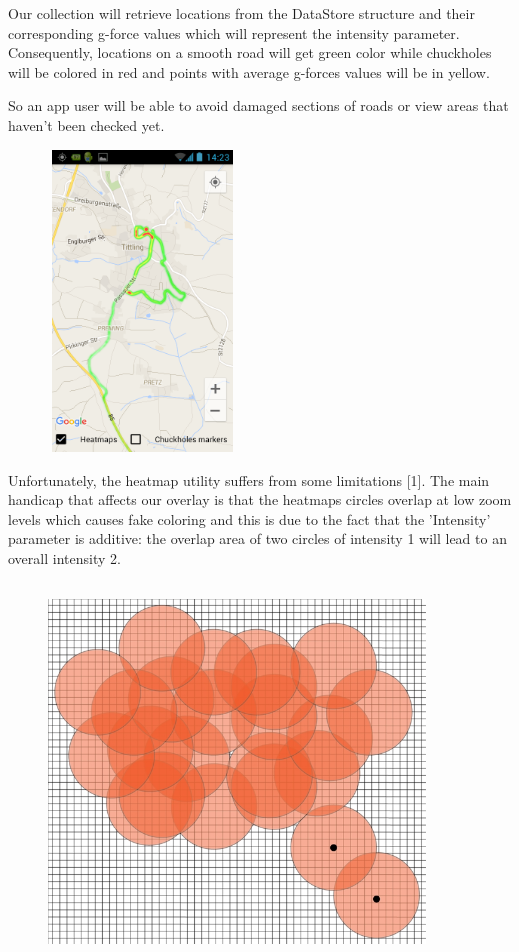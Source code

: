 \documentclass[10pt,a4paper]{article} %
\begin{document}
    Our collection will retrieve locations from the DataStore structure and their corresponding g-force values which will represent the intensity parameter. Consequently, locations on a smooth road will get green color while chuckholes will be colored in red and points with average g-forces values will be in yellow.
    
    So an app user will be able to avoid damaged sections of roads or view areas that haven't been checked yet.
     
    \begin{figure}[H]
    \centering
	   
       \includegraphics[width=5cm, height=8cm]{pic4}
       
    \end{figure}
    
    Unfortunately, the heatmap utility suffers from some limitations [1]. The main handicap that affects our overlay is that the heatmaps circles overlap at low zoom levels which causes fake coloring and this is due to the fact that the 'Intensity' parameter is additive: the overlap area of two circles of intensity 1 will lead to an overall intensity 2.
    
    \begin{figure}[H]
    \centering
	
	  
	   
       \includegraphics[width=10cm, height=10cm]{pic6}
    
       
    \end{figure}
    
\end{document}
